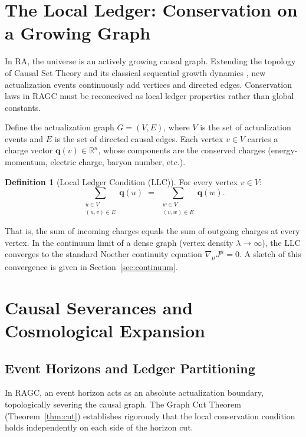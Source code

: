 \documentclass[11pt,a4paper]{article}
\theoremstyle{plain}
\theoremstyle{definition}
\newtheorem{definition}[theorem]{Definition}
\theoremstyle{remark}
\begin{document}
\section{The Local Ledger: Conservation on a Growing Graph}
\label{sec:ledger}

In RA, the universe is an actively growing causal graph. Extending the topology
of Causal Set Theory \citep{Dowker2005} and its classical sequential growth
dynamics \citep{RideoutSorkin2000}, new actualization events continuously add
vertices and directed edges. Conservation laws in RAGC must be reconceived as
local ledger properties rather than global constants.

Define the actualization graph $G = (V, E)$, where $V$ is the set of actualization
events and $E$ is the set of directed causal edges. Each vertex $v \in V$ carries
a charge vector $\mathbf{q}(v) \in \mathbb{R}^{n}$, whose components are the
conserved charges (energy-momentum, electric charge, baryon number, etc.).

\begin{definition}[Local Ledger Condition (LLC)]
For every vertex $v \in V$:
\begin{equation}
  \sum_{\substack{u \in V \\ (u,v)\in E}} \mathbf{q}(u)
  \;=\;
  \sum_{\substack{w \in V \\ (v,w)\in E}} \mathbf{q}(w).
\end{equation}
\end{definition}

That is, the sum of incoming charges equals the sum of outgoing charges at every
vertex. In the continuum limit of a dense graph (vertex density $\lambda \to
\infty$), the LLC converges to the standard Noether continuity equation
$\nabla_{\mu}J^{\mu} = 0$. A sketch of this convergence is given in
Section~\ref{sec:continuum}.

\section{Causal Severances and Cosmological Expansion}
\label{sec:severances}

\subsection{Event Horizons and Ledger Partitioning}

In RAGC, an event horizon acts as an absolute actualization boundary,
topologically severing the causal graph. The Graph Cut Theorem
(Theorem~\ref{thm:cut}) establishes rigorously that the local conservation
condition holds independently on each side of the horizon cut.
\end{document}
